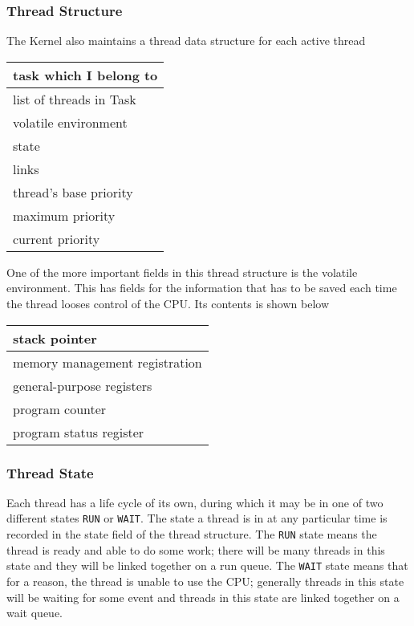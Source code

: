 \subsubsection{Thread Structure}
The Kernel also maintains a thread data structure for each active thread
\begin{table}[H]
    \centering
    \begin{tabular}{|p{}|}
        \hline
        task which I belong to\\
        \hline
        list of threads in Task\\
        \hline
        volatile environment\\
        \hline
        state\\
        \hline
        links\\
        \hline
        thread's base priority\\
        \hline
        maximum priority\\
        \hline
        current priority\\
        \hline
    \end{tabular}
\end{table}
One of the more important fields in this thread structure is the volatile environment. This has fields for the information that has to be saved each time the thread looses control of the CPU. Its contents is shown below
\begin{table}[H]
    \centering
    \begin{tabular}{|p{}|}
        \hline
        stack pointer\\
        \hline
        memory management registration\\
        \hline
        general-purpose registers\\
        \hline
        program counter\\
        \hline
        program status register\\
        \hline
    \end{tabular}
\end{table}

\subsubsection{Thread State}
Each thread has a life cycle of its own, during which it may be in one of two different states \verb|RUN| or \verb|WAIT|. The state a thread is in at any particular time is recorded in the state field of the thread structure. The \verb|RUN| state means the thread is ready and able to do some work; there will be many threads in this state and they will be linked together on a run queue. The \verb|WAIT| state means that for a reason, the thread is unable to use the CPU; generally threads in this state will be waiting for some event and threads in this state are linked together on a wait queue. 

